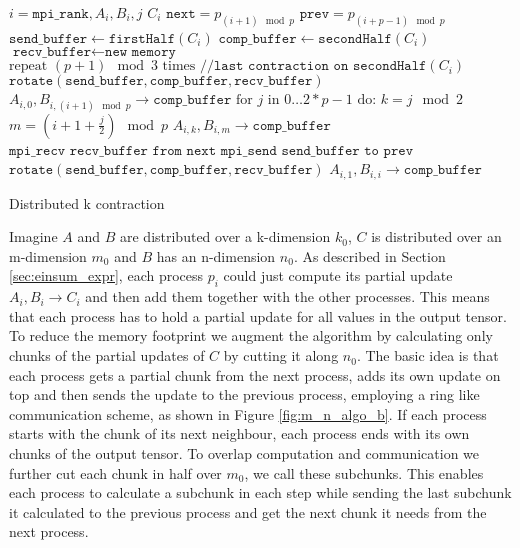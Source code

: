 \begin{algorithm}[ht]
    \begin{algorithmic}
    \Require $i = \texttt{mpi\_rank}, A_i, B_i, j$
    \Ensure $C_i$
    \State $\texttt{next} = p_{(i+1) \mod p}$
    \State $\texttt{prev} = p_{(i+p-1) \mod p}$
    \State $\texttt{send\_buffer} \gets \texttt{firstHalf}(C_i)$
    \State $\texttt{comp\_buffer} \gets \texttt{secondHalf}(C_i)$
    \State $\texttt{recv\_buffer} \gets \texttt{new memory}$
    \State $\text{repeat } (p+1) \mod 3 \text{ times} \texttt{ //last contraction on secondHalf}(C_i)$ 
    \State \indent $\texttt{rotate}(\texttt{send\_buffer},\texttt{comp\_buffer},\texttt{recv\_buffer})$
    \State $A_{i,0}, B_{i,(i+1) \mod p} \rightarrow \texttt{comp\_buffer}$
    \State  $\text{for } j \text{ in } 0\dots 2 * p - 1 \text{ do:}$
    \State \indent $ k = j \mod 2 $
    \State \indent $ m = (i + 1 + \frac{j}{2}) \mod p$
    \State \indent {}
    \State \indent \indent $A_{i,k}, B_{i,m} \rightarrow \texttt{comp\_buffer}$
    \State \indent \indent $\texttt{mpi\_recv recv\_buffer from next}$
    \State \indent \indent $\texttt{mpi\_send send\_buffer to prev}$
    \State \indent $\texttt{rotate}(\texttt{send\_buffer},\texttt{comp\_buffer},\texttt{recv\_buffer})$
    \State $A_{i,1}, B_{i,i} \rightarrow \texttt{comp\_buffer}$

\end{algorithmic}
\caption{Distributed k contraction}
\label{alg:k_pseudocode}
\end{algorithm}


Imagine $A$ and $B$ are distributed over a k-dimension $k_0$, $C$ is distributed over an m-dimension $m_0$ and $B$ has an n-dimension $n_0$.
As described in Section \ref{sec:einsum_expr}, each process $p_i$ could just compute its partial update $A_i, B_i \rightarrow C_i$ and then add them together with the other processes.
This means that each process has to hold a partial update for all values in the output tensor.
To reduce the memory footprint we augment the algorithm by calculating only chunks of the partial updates of $C$ by cutting it along $n_0$.
The basic idea is that each process gets a partial chunk from the next process, adds its own update on top and then sends the update to the previous process, employing a ring like communication scheme, as shown in Figure \ref{fig:m_n_algo_b}.
If each process starts with the chunk of its next neighbour, each process ends with its own chunks of the output tensor.
To overlap computation and communication we further cut each chunk in half over $m_0$, we call these subchunks.
This enables each process to calculate a subchunk in each step while sending the last subchunk it calculated to the previous process and get the next chunk it needs from the next process.

